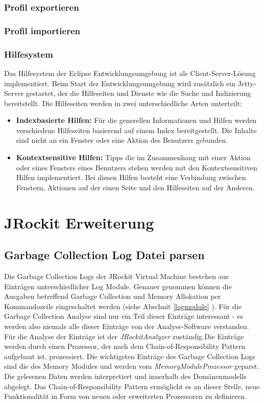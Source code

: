 \subsubsection{Profil exportieren}
\subsubsection{Profil importieren}
\subsubsection{Hilfesystem}
Das Hilfesystem der Eclipse Entwicklungsumgebung ist als Client-Server-Lösung implementiert. Beim Start der Entwicklungsumgebung wird zusätzlich ein Jetty-Server gestartet, der die Hilfeseiten und Dienste wie die Suche und Indizierung bereitstellt. Die Hilfeseiten werden in zwei unterschiedliche Arten unterteilt:
\begin{itemize}
\item \textbf{Indexbasierte Hilfen:} Für die generellen Informationen und Hilfen werden verschiedene Hilfeseiten basierend auf einem Index bereitgestellt. Die Inhalte sind nicht an ein Fenster oder eine Aktion des Benutzers gebunden. 
\item \textbf{Kontextsensitive Hilfen:} Tipps die im Zusammenhang mit einer Aktion oder eines Fensters eines Benutzers stehen werden mit den Kontextsensitiven Hilfen implementiert. Bei diesen Hilfen besteht eine Verbindung zwischen Fenstern, Aktionen auf der einen Seite und den Hilfeseiten auf der Anderen.
\end{itemize}



\section{JRockit Erweiterung}
\subsection{Garbage Collection Log Datei parsen}
Die Garbage Collection Logs der JRockit Virtual Machine bestehen aus Einträgen unterschiedlicher Log Module. Genauer genommen können die Ausgaben betreffend Garbage Collection und Memory Allokation per Kommandozeile eingeschaltet werden (siehe Abschnit \ref{logmodule} ). Für die Garbage Collection Analyse sind nur ein Teil dieser Einträge interessant - es werden also niemals alle dieser Einträge von der Analyse-Software verstanden. Für die Analyse der Einträge ist der \textit{JRockitAnalyzer} zuständig.Die Einträge werden durch einen Prozessor, der nach dem Chain-of-Responsibility Pattern\cite{wiki:chainOfResponsibilityPattern} aufgebaut ist, prozessiert. Die wichtigsten Einträge des Garbage Collection Logs sind die des Memory Modules und werden vom 
\textit{MemoryModuleProzessor} geparst. Die gelesenen Daten werden interpretiert und innerhalb des Domänenmodells abgelegt. Das Chain-of-Responsibility Pattern ermöglicht es an dieser Stelle, neue Funktionalität in Form von neuen oder erweiterten Prozessoren zu definieren.

